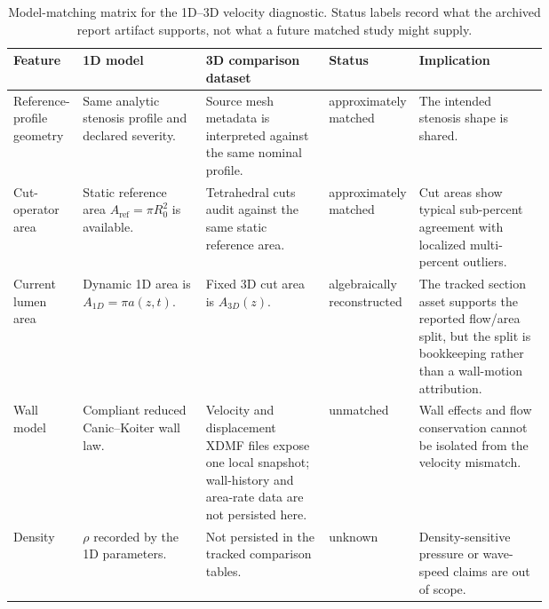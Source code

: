 \begin{landscape}
\begin{table}[!htb]
    \centering
    \scriptsize
    \caption{Model-matching matrix for the 1D--3D velocity diagnostic. Status
    labels record what the archived report artifact supports, not what a future
    matched study might supply.}
    \label{tab:t1-model-matching-matrix}
    \begin{tabularx}{\linewidth}{@{}
        >{\raggedright\arraybackslash}p{0.13\linewidth}
        >{\raggedright\arraybackslash}p{0.23\linewidth}
        >{\raggedright\arraybackslash}p{0.23\linewidth}
        >{\raggedright\arraybackslash}p{0.11\linewidth}
        >{\raggedright\arraybackslash}X@{}}
        \toprule
        \textbf{Feature}
            & \textbf{1D model}
            & \textbf{3D comparison dataset}
            & \textbf{Status}
            & \textbf{Implication} \\
        \midrule
        Reference-profile geometry
            & Same analytic stenosis profile and declared severity.
            & Source mesh metadata is interpreted against the same nominal
            profile.
            & approximately matched
            & The intended stenosis shape is shared. \\
        Cut-operator area
            & Static reference area $A_{\mathrm{ref}}=\pi R_0^2$ is available.
            & Tetrahedral cuts audit against the same static reference area.
            & approximately matched
            & Cut areas show typical sub-percent agreement with localized
            multi-percent outliers. \\
        Current lumen area
            & Dynamic 1D area is $A_{1D}=\pi a(z,t)$.
            & Fixed 3D cut area is $A_{3D}(z)$.
            & algebraically reconstructed
            & The tracked section asset supports the reported flow/area split,
            but the split is bookkeeping rather than a wall-motion attribution. \\
        Wall model
            & Compliant reduced Canic--Koiter wall law.
            & Velocity and displacement XDMF files expose one local snapshot;
            wall-history and area-rate data are not persisted here.
            & unmatched
            & Wall effects and flow conservation cannot be isolated from the
            velocity mismatch. \\
        Density
            & $\rho$ recorded by the 1D parameters.
            & Not persisted in the tracked comparison tables.
            & unknown
            & Density-sensitive pressure or wave-speed claims are out of scope. \\

\end{tabularx}
\end{table}
\end{landscape}
